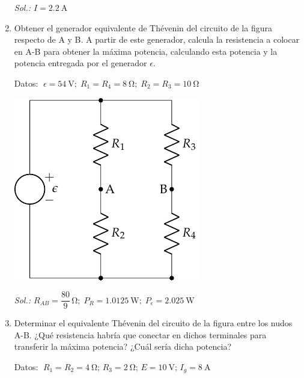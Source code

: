 \begin{enumerate}
  \emph{Sol.:\; $I=\qty{2.2}{\ampere}$}

\item Obtener el generador equivalente de Thévenin del circuito de la
  figura respecto de A y B. A partir de este generador, calcula la
  resistencia a colocar en A-B para obtener la máxima potencia,
  calculando esta potencia y la potencia entregada por el generador
  $\epsilon$.

  Datos:
  $\; \epsilon = \qty{54}{\volt};\; R_1 = R_4 = \qty{8}{\ohm};\;
  R_2 = R_3 = \qty{10}{\ohm}$

  \begin{center}
    \includegraphics{../figs/Thevenin2}
  \end{center}

    \emph{Sol.:\;
      $R_{AB} = \dfrac{80}{9}\,\si{\ohm}; \; P_R = \qty{1.0125}{\watt}; \;
      P_\epsilon = \qty{2.025}{\watt}$}

  \item Determinar el equivalente Thévenin del circuito de la figura
    entre los nudos A-B. ¿Qué resistencia habría que conectar en
    dichos terminales para transferir la máxima potencia? ¿Cuál sería
    dicha potencia?

    Datos: $\; R_1 = R_2 = \qty{4}{\ohm}$; $R_3 = \qty{2}{\ohm}$; $E = \qty{10}{\volt}$; $I_g = \qty{8}{\ampere}$
    

\end{enumerate}
